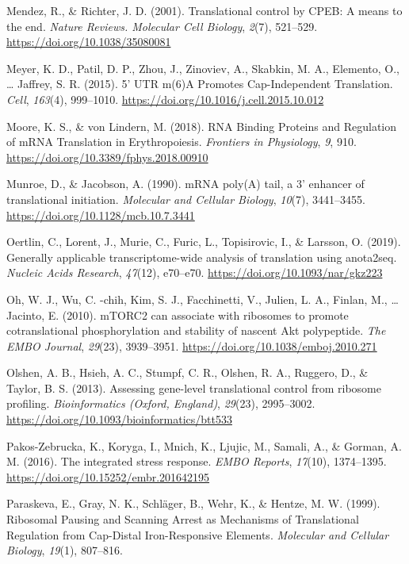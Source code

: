 \documentclass[12pt,openany]{book}
\begin{document}
\hypertarget{ref-Mendez2001}{}
Mendez, R., \& Richter, J. D. (2001). Translational control by CPEB: A
means to the end. \emph{Nature Reviews. Molecular Cell Biology},
\emph{2}(7), 521--529. \url{https://doi.org/10.1038/35080081}

\hypertarget{ref-Meyer2015}{}
Meyer, K. D., Patil, D. P., Zhou, J., Zinoviev, A., Skabkin, M. A.,
Elemento, O., \ldots{} Jaffrey, S. R. (2015). 5' UTR m(6)A Promotes
Cap-Independent Translation. \emph{Cell}, \emph{163}(4), 999--1010.
\url{https://doi.org/10.1016/j.cell.2015.10.012}

\hypertarget{ref-Moore2018}{}
Moore, K. S., \& von Lindern, M. (2018). RNA Binding Proteins and
Regulation of mRNA Translation in Erythropoiesis. \emph{Frontiers in
Physiology}, \emph{9}, 910.
\url{https://doi.org/10.3389/fphys.2018.00910}

\hypertarget{ref-Munroe1990}{}
Munroe, D., \& Jacobson, A. (1990). mRNA poly(A) tail, a 3' enhancer of
translational initiation. \emph{Molecular and Cellular Biology},
\emph{10}(7), 3441--3455. \url{https://doi.org/10.1128/mcb.10.7.3441}

\hypertarget{ref-Oertlin2019}{}
Oertlin, C., Lorent, J., Murie, C., Furic, L., Topisirovic, I., \&
Larsson, O. (2019). Generally applicable transcriptome-wide analysis of
translation using anota2seq. \emph{Nucleic Acids Research},
\emph{47}(12), e70--e70. \url{https://doi.org/10.1093/nar/gkz223}

\hypertarget{ref-Oh2010}{}
Oh, W. J., Wu, C. -chih, Kim, S. J., Facchinetti, V., Julien, L. A.,
Finlan, M., \ldots{} Jacinto, E. (2010). mTORC2 can associate with
ribosomes to promote cotranslational phosphorylation and stability of
nascent Akt polypeptide. \emph{The EMBO Journal}, \emph{29}(23),
3939--3951. \url{https://doi.org/10.1038/emboj.2010.271}

\hypertarget{ref-Olshen2013}{}
Olshen, A. B., Hsieh, A. C., Stumpf, C. R., Olshen, R. A., Ruggero, D.,
\& Taylor, B. S. (2013). Assessing gene-level translational control from
ribosome profiling. \emph{Bioinformatics (Oxford, England)},
\emph{29}(23), 2995--3002.
\url{https://doi.org/10.1093/bioinformatics/btt533}

\hypertarget{ref-Pakos-Zebrucka2016}{}
Pakos-Zebrucka, K., Koryga, I., Mnich, K., Ljujic, M., Samali, A., \&
Gorman, A. M. (2016). The integrated stress response. \emph{EMBO
Reports}, \emph{17}(10), 1374--1395.
\url{https://doi.org/10.15252/embr.201642195}

\hypertarget{ref-Paraskeva1999}{}
Paraskeva, E., Gray, N. K., Schläger, B., Wehr, K., \& Hentze, M. W.
(1999). Ribosomal Pausing and Scanning Arrest as Mechanisms of
Translational Regulation from Cap-Distal Iron-Responsive Elements.
\emph{Molecular and Cellular Biology}, \emph{19}(1), 807--816.
\end{document}
